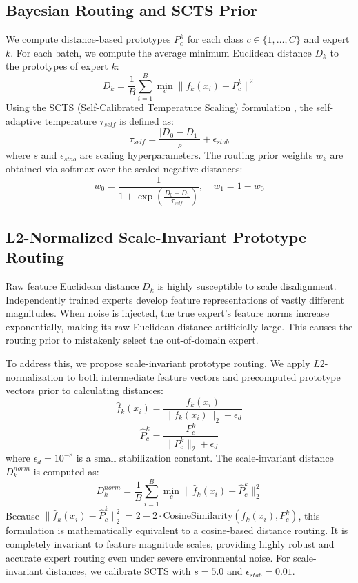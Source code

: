 \documentclass{article}
\begin{document}
\subsection{Bayesian Routing and SCTS Prior}
We compute distance-based prototypes $P_{c}^k$ for each class $c \in \{1,\dots,C\}$ and expert $k$. For each batch, we compute the average minimum Euclidean distance $D_k$ to the prototypes of expert $k$:
\begin{equation}
    D_k = \frac{1}{B} \sum_{i=1}^B \min_{c} \|f_k(x_i) - P_{c}^k\|^2
\end{equation}
Using the SCTS (Self-Calibrated Temperature Scaling) formulation \cite{clw_fisher25}, the self-adaptive temperature $\tau_{self}$ is defined as:
\begin{equation}
    \tau_{self} = \frac{|D_0 - D_1|}{s} + \epsilon_{stab}
\end{equation}
where $s$ and $\epsilon_{stab}$ are scaling hyperparameters. The routing prior weights $w_k$ are obtained via softmax over the scaled negative distances:
\begin{equation}
    w_0 = \frac{1}{1 + \exp\left(\frac{D_0 - D_1}{\tau_{self}}\right)}, \quad w_1 = 1 - w_0
\end{equation}

\subsection{L2-Normalized Scale-Invariant Prototype Routing}
Raw feature Euclidean distance $D_k$ is highly susceptible to scale disalignment. Independently trained experts develop feature representations of vastly different magnitudes. When noise is injected, the true expert's feature norms increase exponentially, making its raw Euclidean distance artificially large. This causes the routing prior to mistakenly select the out-of-domain expert.

To address this, we propose scale-invariant prototype routing. We apply $L2$-normalization to both intermediate feature vectors and precomputed prototype vectors prior to calculating distances:
\begin{equation}
    \hat{f}_k(x_i) = \frac{f_k(x_i)}{\|f_k(x_i)\|_2 + \epsilon_d}
\end{equation}
\begin{equation}
    \hat{P}_{c}^k = \frac{P_{c}^k}{\|P_{c}^k\|_2 + \epsilon_d}
\end{equation}
where $\epsilon_d = 10^{-8}$ is a small stabilization constant. The scale-invariant distance $D_k^{norm}$ is computed as:
\begin{equation}
    D_k^{norm} = \frac{1}{B} \sum_{i=1}^B \min_{c} \|\hat{f}_k(x_i) - \hat{P}_{c}^k\|_2^2
\end{equation}
Because $\|\hat{f}_k(x_i) - \hat{P}_{c}^k\|_2^2 = 2 - 2 \cdot \text{CosineSimilarity}(f_k(x_i), P_{c}^k)$, this formulation is mathematically equivalent to a cosine-based distance routing. It is completely invariant to feature magnitude scales, providing highly robust and accurate expert routing even under severe environmental noise. For scale-invariant distances, we calibrate SCTS with $s=5.0$ and $\epsilon_{stab}=0.01$.
\end{document}
